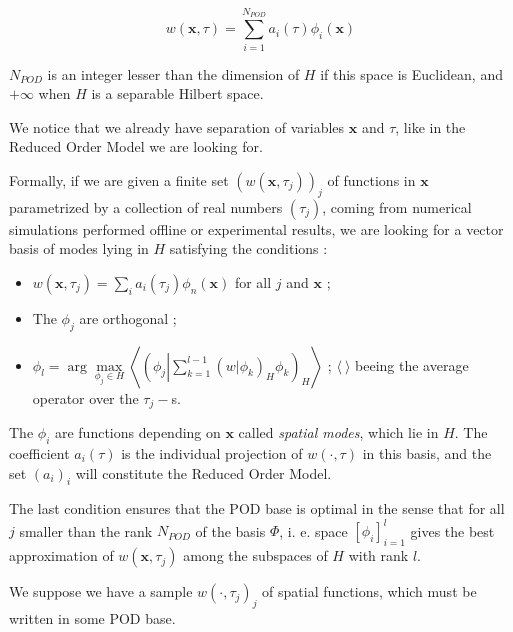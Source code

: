 \begin{equation}\label{POD}
w(\mathbf{x},\tau)=\sum\limits_{i=1}^{N_{POD}} a_i(\tau)\phi_i(\mathbf{x})
\end{equation}

$N_{POD}$ is an integer lesser than the dimension of $H$ if this space is Euclidean, %
and $+\infty$ when $H$ is a separable Hilbert space.

\par
We notice that we already have separation of variables $\mathbf{x}$ and $\tau$, like in the Reduced Order Model we are looking for.

\ligneinter
Formally, if we are given a finite set $(w(\mathbf{x},\tau_j))_j$ of functions in $\mathbf{x}$ parametrized by a collection of real numbers $(\tau_j)$, %
coming from numerical simulations performed \og{} offline \fg{} or experimental results, we are looking for a vector basis of modes lying in %
$H$ %
satisfying the conditions :

\begin{itemize}
\item $w(\mathbf{x},\tau_j)=\sum\limits_i a_i(\tau_j)\phi_n(\mathbf{x})$ for all $j$ and $\mathbf{x}$ ;
\item The $\phi_j$ are orthogonal ;
\item $\phi_l= \arg\max\limits_{\phi_j\in H}\left\langle\left(\phi_j\left|\sum\limits_{k=1}^{l-1}\left(w|\phi_k\right)_H\phi_k\right.\right)_H\right\rangle$ ; %
$\langle \ \rangle$ beeing the average operator over the $\tau_j-$s.
\end{itemize}

\par
The $\phi_i$ are functions depending on $\mathbf{x}$ called \emph{spatial modes}, which lie in $H$. %
The coefficient $a_i(\tau)$ is the individual projection of $w(\cdot,\tau)$ in this basis, %
and the set $(a_i)_i$ will constitute the Reduced Order Model.

\par
The last condition ensures that the POD base is optimal in the sense that for all $j$ smaller than the rank $N_{POD}$ of the basis $\Phi$, i. e. %
space $[\phi_i]_{i=1}^{l}$ gives the best approximation of $w(\mathbf{x},\tau_j)$ among the subspaces of $H$ with rank $l$.

\ligneinter
We suppose we have a sample $w(\cdot,\tau_j)_j$ of spatial functions, which must be written in some POD base.

